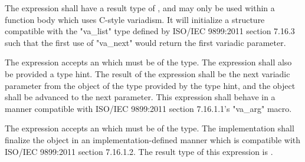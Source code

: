
\specsubsubitem
The  expression shall have a result type of
, and may only be used within a function body which uses
C-style variadism. It will initialize a structure compatible with the
"va\_list" type defined by ISO/IEC 9899:2011 section 7.16.3 such that the first
use of "va\_next" would return the first variadic parameter.

\specsubsubitem
The  expression accepts an  which
must be of the  type. The expression shall also be provided a
type hint. The result of the expression shall be the next variadic parameter
from the  object of the type provided by the type hint, and
the object shall be advanced to the next parameter. This expression shall
behave in a manner compatible with ISO/IEC 9899:2011 section 7.16.1.1's
"va\_arg" macro.

\specsubsubitem
The  expression accepts an  which
must be of the  type. The implementation shall finalize the
 object in an implementation-defined manner which is
compatible with ISO/IEC 9899:2011 section 7.16.1.2. The result type of this
expression is .


\begin{grammar}
 \\
	 \\
	 \\
	 \\
	 \\
	 \\
	 \\
	 \\
\end{grammar}


\begin{grammar}
 \\
	 \\
	 \\
	 \\
	 \\
	  \\

 \oneof \\
	\terminal{+}
	\terminal{-}
	\terminal{\textasciitilde}
	\terminal{!}
	\terminal{*}
	\terminal{\&}
\end{grammar}

